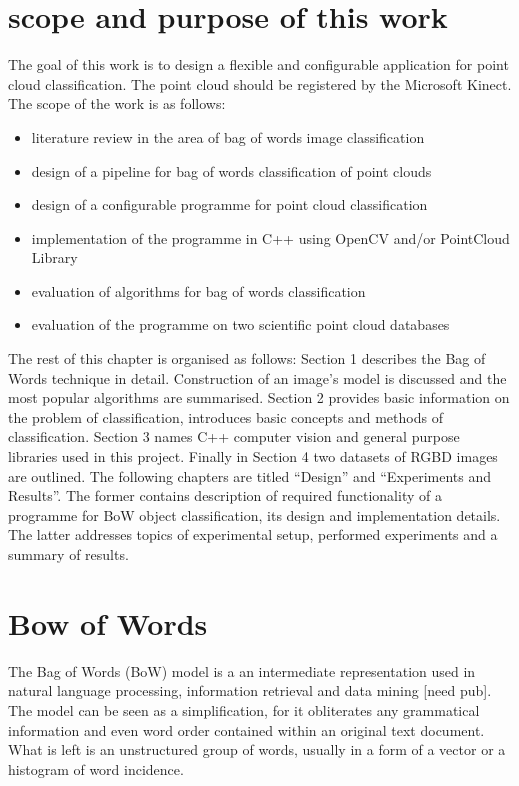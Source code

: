        \section{scope and purpose of this work}
       The goal of this work is to design a flexible and configurable application for point cloud classification. The point cloud should be registered by the Microsoft Kinect. The scope of the work is as follows:
       \begin{itemize}
        \item literature review in the area of bag of words image classification
        \item design of a pipeline for bag of words classification of point clouds
        \item design of a configurable programme for point cloud classification
        \item implementation of the programme in C++ using OpenCV and/or PointCloud Library
        \item evaluation of algorithms for bag of words classification
        \item evaluation of the programme on two scientific point cloud databases
       \end{itemize}

	The rest of this chapter is organised as follows: Section 1 describes the Bag of Words technique in detail. Construction of an image's model is discussed and the most popular algorithms are summarised. Section 2 provides basic information on the problem of classification, introduces basic concepts and methods of classification. Section 3 names C++ computer vision and general purpose libraries used in this project. Finally in Section 4 two datasets of RGBD images are outlined. The following chapters are titled ``Design'' and ``Experiments and Results''. The former contains description of required functionality of a programme for BoW object classification, its design and implementation details. The latter addresses topics of experimental setup, performed experiments and a summary of results. 
	
\section{Bow of Words}

	The Bag of Words (BoW) model is a an intermediate representation used in natural language processing, information retrieval and data mining [need pub]. The model can be seen as a simplification, for it obliterates any grammatical information and even word order contained within an original text document. What is left is an unstructured group of words, usually in a form of a vector or a histogram of word incidence.

